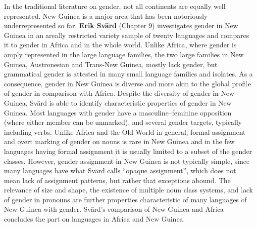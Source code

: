 \documentclass[output=collectionpaper]{langsci/langscibook}
\begin{document}
In the traditional literature on gender, not all continents are equally well represented. New Guinea is a major area that has been notoriously underrepresented so far. \textbf{Erik Svärd} (Chapter 9) investigates gender in New Guinea in an areally restricted variety sample of twenty languages and compares it to gender in Africa and in the whole world. Unlike Africa, where gender is amply represented in the large language families, the two large families in New Guinea, Austronesian and Trans-New Guinea, mostly lack gender, but grammatical gender is attested in many small language families and isolates. As a consequence, gender in New Guinea is diverse and more akin to the global profile of gender in comparison with Africa. Despite the diversity of gender in New Guinea, Svärd is able to identify characteristic properties of gender in New Guinea. Most languages with gender have a masculine–feminine opposition (where either member can be unmarked), and several gender targets, typically including verbs. Unlike Africa and the Old World in general, formal assignment and overt marking of gender on nouns is rare in New Guinea and in the few languages having formal assignment it is usually limited to a subset of the gender classes. However, gender assignment in New Guinea is not typically simple, since many languages have what Svärd calls ``opaque assignment'', which does not mean lack of assignment patterns, but rather that exceptions abound. The relevance of size and shape, the existence of multiple noun class systems, and lack of gender in pronouns are further properties characteristic of many languages of New Guinea with gender. Svärd’s comparison of New Guinea and Africa concludes the part on languages in Africa and New Guinea.
\end{document}
